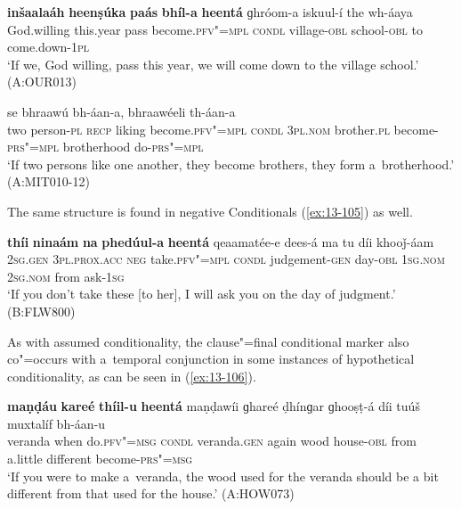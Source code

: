 \begin{exe}
\ex
\label{ex:13-103}
\gll \textbf{inšaalaáh} \textbf{heenṣúka} \textbf{paás} \textbf{bhíl-a} \textbf{heentá}  ɡhróom-a iskuul-í the wh-áaya \\
 God.willing this.year  pass become.\textsc{pfv"=mpl} \textsc{condl}  village-\textsc{obl} school-\textsc{obl} to come.down-\textsc{1pl} \\
\glt `If we, God willing, pass this year, we will come down to the village school.' (A:OUR013)

\ex
\label{ex:13-104}
 se bhraawú bh-áan-a,
bhraawéeli  th-áan-a \\
two person-\textsc{pl} \textsc{recp} liking become.\textsc{pfv"=mpl}  \textsc{condl } \textsc{3pl.nom} brother.\textsc{pl} become-\textsc{prs"=mpl} brotherhood do-\textsc{prs"=mpl} \\
\glt `If two persons like one another, they become brothers, they form a~brotherhood.' (A:MIT010-12) 
\end{exe}

The same structure is found in negative Conditionals (\ref{ex:13-105}) as well.

\begin{exe}
\ex
\label{ex:13-105}
\gll \textbf{thíi} \textbf{ninaám} \textbf{na} \textbf{phedúul-a} \textbf{heentá}  qeaamatée-e dees-á ma tu díi khooǰ-áam \\
\textsc{2sg.gen} \textsc{3pl.prox.acc} \textsc{neg} take.\textsc{pfv"=mpl} \textsc{condl} judgement-\textsc{gen} day-\textsc{obl} \textsc{1sg.nom} \textsc{2sg.nom} from ask-\textsc{1sg}  \\
\glt `If you don't take these [to her], I will ask you on the day of judgment.' (B:FLW800) 
\end{exe}

As with assumed conditionality, the clause"=final conditional marker also co"=occurs with a~temporal conjunction in some instances of hypothetical conditionality, as can be seen in (\ref{ex:13-106}). 

\begin{exe}
\ex
\label{ex:13-106}
\gll \textbf{maṇḍáu} \textbf{kareé} \textbf{thíil-u} \textbf{heentá} maṇḍawíi ɡhareé ḍhínɡar ɡhooṣṭ-á díi tuúš muxtalíf bh-áan-u  \\
veranda when do.\textsc{pfv"=msg} \textsc{condl} veranda.\textsc{gen} again wood house-\textsc{obl} from a.little different become-\textsc{prs"=msg} \\
\glt `If you were to make a~veranda, the wood used for the veranda should be a bit different from that used for the house.' (A:HOW073) 
\end{exe}

